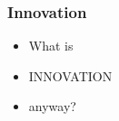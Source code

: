 
\begin{frame}
  \frametitle{Innovation}
  \begin{itemize}
          \item What is
          \item \alert{ INNOVATION }
          \item anyway?
  \end{itemize}
\end{frame}
